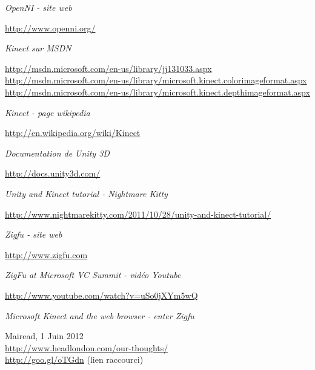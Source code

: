 \begin{thebibliography}{200}
\begin{footnotesize}
  \emph{OpenNI - site web}\\
  \begin{tiny}
  \url{http://www.openni.org/}
  \end{tiny}
  
  \emph{Kinect sur MSDN}\\
  \begin{tiny}
  \url{http://msdn.microsoft.com/en-us/library/jj131033.aspx}
  \url{http://msdn.microsoft.com/en-us/library/microsoft.kinect.colorimageformat.aspx}
  \url{http://msdn.microsoft.com/en-us/library/microsoft.kinect.depthimageformat.aspx}
  \end{tiny}

  \emph{Kinect - page wikipedia}\\
  \begin{tiny}
  \url{http://en.wikipedia.org/wiki/Kinect}
  \end{tiny}
  
  \emph{Documentation de Unity 3D}\\
  \begin{tiny}
  \url{http://docs.unity3d.com/}
  \end{tiny}
  
  \emph{Unity and Kinect tutorial - Nightmare Kitty}\\
  \begin{tiny}
  \url{http://www.nightmarekitty.com/2011/10/28/unity-and-kinect-tutorial/}
  \end{tiny}

  \emph{Zigfu - site web}\\
  \begin{tiny}
  \url{http://www.zigfu.com}
  \end{tiny}

  \emph{ZigFu at Microsoft VC Summit - vidéo Youtube}\\
  \begin{tiny}
  \url{http://www.youtube.com/watch?v=uSo0jXYm5wQ}
  \end{tiny}
  
  \emph{Microsoft Kinect and the web browser - enter Zigfu}\\
  \begin{tiny}
  Mairead, 1 Juin 2012\\
  \url{http://www.headlondon.com/our-thoughts/}\\
  \url{http://goo.gl/oTGdn} (lien raccourci)
  \end{tiny}
  

\end{footnotesize}
\end{thebibliography}
